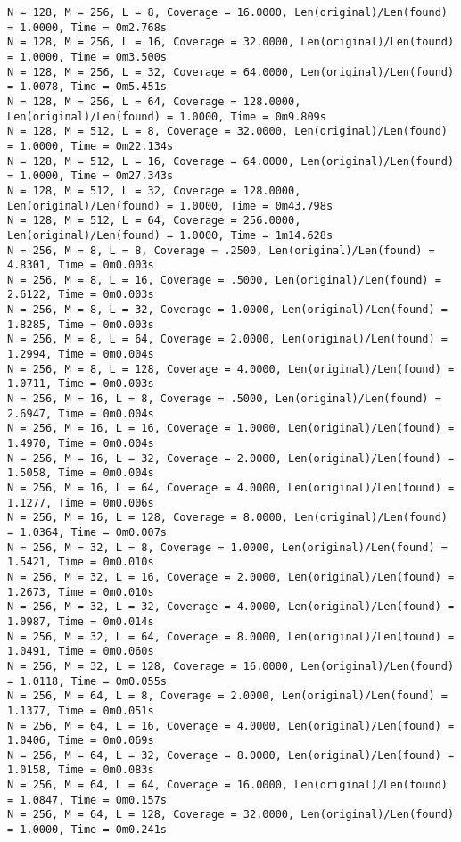 \documentclass{article}
\begin{document}
{\begin{verbatim}
N = 128, M = 256, L = 8, Coverage = 16.0000, Len(original)/Len(found) = 1.0000, Time = 0m2.768s
N = 128, M = 256, L = 16, Coverage = 32.0000, Len(original)/Len(found) = 1.0000, Time = 0m3.500s
N = 128, M = 256, L = 32, Coverage = 64.0000, Len(original)/Len(found) = 1.0078, Time = 0m5.451s
N = 128, M = 256, L = 64, Coverage = 128.0000, Len(original)/Len(found) = 1.0000, Time = 0m9.809s
N = 128, M = 512, L = 8, Coverage = 32.0000, Len(original)/Len(found) = 1.0000, Time = 0m22.134s
N = 128, M = 512, L = 16, Coverage = 64.0000, Len(original)/Len(found) = 1.0000, Time = 0m27.343s
N = 128, M = 512, L = 32, Coverage = 128.0000, Len(original)/Len(found) = 1.0000, Time = 0m43.798s
N = 128, M = 512, L = 64, Coverage = 256.0000, Len(original)/Len(found) = 1.0000, Time = 1m14.628s
N = 256, M = 8, L = 8, Coverage = .2500, Len(original)/Len(found) = 4.8301, Time = 0m0.003s
N = 256, M = 8, L = 16, Coverage = .5000, Len(original)/Len(found) = 2.6122, Time = 0m0.003s
N = 256, M = 8, L = 32, Coverage = 1.0000, Len(original)/Len(found) = 1.8285, Time = 0m0.003s
N = 256, M = 8, L = 64, Coverage = 2.0000, Len(original)/Len(found) = 1.2994, Time = 0m0.004s
N = 256, M = 8, L = 128, Coverage = 4.0000, Len(original)/Len(found) = 1.0711, Time = 0m0.003s
N = 256, M = 16, L = 8, Coverage = .5000, Len(original)/Len(found) = 2.6947, Time = 0m0.004s
N = 256, M = 16, L = 16, Coverage = 1.0000, Len(original)/Len(found) = 1.4970, Time = 0m0.004s
N = 256, M = 16, L = 32, Coverage = 2.0000, Len(original)/Len(found) = 1.5058, Time = 0m0.004s
N = 256, M = 16, L = 64, Coverage = 4.0000, Len(original)/Len(found) = 1.1277, Time = 0m0.006s
N = 256, M = 16, L = 128, Coverage = 8.0000, Len(original)/Len(found) = 1.0364, Time = 0m0.007s
N = 256, M = 32, L = 8, Coverage = 1.0000, Len(original)/Len(found) = 1.5421, Time = 0m0.010s
N = 256, M = 32, L = 16, Coverage = 2.0000, Len(original)/Len(found) = 1.2673, Time = 0m0.010s
N = 256, M = 32, L = 32, Coverage = 4.0000, Len(original)/Len(found) = 1.0987, Time = 0m0.014s
N = 256, M = 32, L = 64, Coverage = 8.0000, Len(original)/Len(found) = 1.0491, Time = 0m0.060s
N = 256, M = 32, L = 128, Coverage = 16.0000, Len(original)/Len(found) = 1.0118, Time = 0m0.055s
N = 256, M = 64, L = 8, Coverage = 2.0000, Len(original)/Len(found) = 1.1377, Time = 0m0.051s
N = 256, M = 64, L = 16, Coverage = 4.0000, Len(original)/Len(found) = 1.0406, Time = 0m0.069s
N = 256, M = 64, L = 32, Coverage = 8.0000, Len(original)/Len(found) = 1.0158, Time = 0m0.083s
N = 256, M = 64, L = 64, Coverage = 16.0000, Len(original)/Len(found) = 1.0847, Time = 0m0.157s
N = 256, M = 64, L = 128, Coverage = 32.0000, Len(original)/Len(found) = 1.0000, Time = 0m0.241s

\end{verbatim}}
\end{document}
